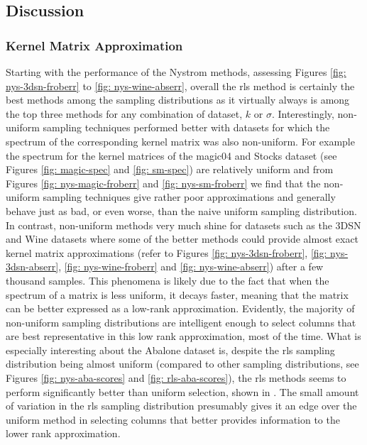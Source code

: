 \subsection{Discussion}\label{Section5.3}

\subsubsection{Kernel Matrix Approximation}\label{Section5.3.1}

Starting with the performance of the Nystrom methods, assessing Figures \ref{fig: nys-3dsn-froberr} to \ref{fig: nys-wine-abserr}, overall the rls method is certainly the best methods among the sampling distributions as it virtually always is among the top three methods for any combination of dataset, $k$ or $\sigma$. Interestingly, non-uniform sampling techniques performed better with datasets for which the spectrum of the corresponding kernel matrix was also non-uniform. For example the spectrum for the kernel matrices of the magic04 and Stocks dataset (see Figures \ref{fig: magic-spec} and \ref{fig: sm-spec}) are relatively uniform and from Figures \ref{fig: nys-magic-froberr} and \ref{fig: nys-sm-froberr} we find that the non-uniform sampling techniques give rather poor approximations and generally behave just as bad, or even worse, than the naive uniform sampling distribution. In contrast, non-uniform methods very much shine for datasets such as the 3DSN and Wine datasets where some of the better methods could provide almost exact kernel matrix approximations (refer to Figures \ref{fig: nys-3dsn-froberr}, \ref{fig: nys-3dsn-abserr}, \ref{fig: nys-wine-froberr} and \ref{fig: nys-wine-abserr}) after a few thousand samples. This phenomena is likely due to the fact that when the spectrum of a matrix is less uniform, it decays faster, meaning that the matrix can be better expressed as a low-rank approximation. Evidently, the majority of non-uniform sampling distributions are intelligent enough to select columns that are best representative in this low rank approximation, most of the time. What is especially interesting about the Abalone dataset is, despite the rls sampling distribution being almost uniform (compared to other sampling distributions, see Figures \ref{fig: nys-aba-scores} and \ref{fig: rls-aba-scores}), the rls methods seems to perform significantly better than uniform selection, shown in . The small amount of variation in the rls sampling distribution presumably gives it an edge over the uniform method in selecting columns that better provides information to the lower rank approximation.

